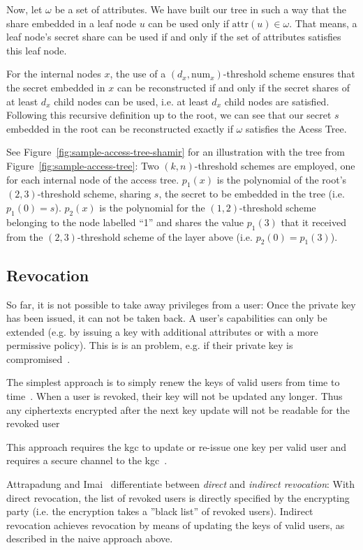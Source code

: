 Now, let $\omega$ be a set of attributes.
We have built our tree in such a way that the share embedded in a leaf node $u$ can be used only if $\text{attr}(u) \in \omega$.
That means, a leaf node's secret share can be used if and only if the set of attributes satisfies this leaf node.

For the internal nodes $x$, the use of a $(d_x, \text{num}_x)$-threshold scheme ensures that the secret embedded in $x$ can be reconstructed if and only if the secret shares of at least $d_x$ child nodes can be used, i.e. at least $d_x$ child nodes are satisfied.
Following this recursive definition up to the root, we can see that our secret $s$ embedded in the root can be reconstructed exactly if $\omega$ satisfies the Acess Tree.

See Figure~\ref{fig:sample-access-tree-shamir} for an illustration with the tree from Figure~\ref{fig:sample-access-tree}:
Two $(k,n)$-threshold schemes are employed, one for each internal node of the access tree.
$p_1(x)$ is the polynomial of the root's $(2,3)$-threshold scheme, sharing $s$, the secret to be embedded in the tree (i.e. $p_1(0) = s$).
$p_2(x)$ is the polynomial for the $(1,2)$-threshold scheme belonging to the node labelled ``1'' and shares the value $p_1(3)$ that it received from the $(2,3)$-threshold scheme of the layer above (i.e. $p_2(0) = p_1(3)$).

\subsection{Revocation}
So far, it is not possible to take away privileges from a user:
Once the private key has been issued, it can not be taken back.
A user's capabilities can only be extended (e.g. by issuing a key with additional attributes or with a more permissive policy).
This is is an problem, e.g. if their private key is compromised~\cite{boldyreva_identity-based_2008}.

The simplest approach is to simply renew the keys of valid users from time to time~\cite{boldyreva_identity-based_2008}.
When a user is revoked, their key will not be updated any longer. Thus any ciphertexts encrypted after the next key update will not be readable for the revoked user~\cite{boldyreva_identity-based_2008}

This approach requires the \acrshort{kgc} to update or re-issue one key per valid user and requires a secure channel to the \acrshort{kgc}~\cite{boldyreva_identity-based_2008}.

Attrapadung and Imai~\cite{attrapadung_attribute-based_2009} differentiate between \emph{direct} and \emph{indirect revocation}: 
With direct revocation, the list of revoked users is directly specified by the encrypting party (i.e. the encryption takes a ''black list'' of revoked users).
Indirect revocation achieves revocation by means of updating the keys of valid users, as described in the naive approach above.


